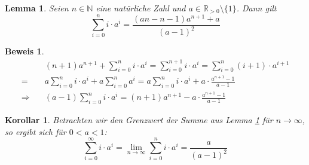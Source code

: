 \documentclass[a4paper]{article}
\newtheorem{korollar}[satz]{Korollar}
\newtheorem{lemma}[satz]{Lemma}
\theoremstyle{nonumberplain}
\newtheorem{beweis}{Beweis}
\begin{document}
\begin{lemma} \label{lem-infsum}
	Seien $n \in \mathbb{N}$ eine natürliche Zahl und $a \in \mathbb{R}_{>0}\setminus\{1\}$. Dann gilt
	\begin{equation}
		\sum_{i=0}^{n}{i\cdot a^i} = \frac{(an-n-1)a^{n+1}+a}{(a-1)^2}
	\end{equation}
\end{lemma}
\begin{beweis}
	\begin{align*}
		&(n+1) a^{n+1} + \sum_{i=0}^{n}{i\cdot a^i} = \sum_{i=0}^{n+1}{i\cdot a^i} = \sum_{i=0}^{n}{(i+1)\cdot a^{i+1}} \\
		=& a \sum_{i=0}^{n}{i\cdot a^{i}} + a \sum_{i=0}^{n}{a^{i}} = a \sum_{i=0}^{n}{i\cdot a^{i}} + a \cdot \frac{a^{n+1}-1}{a-1}\\
		\Rightarrow \quad & (a-1) \sum_{i=0}^{n}{i\cdot a^i} = (n+1) a^{n+1} - a \cdot \frac{a^{n+1}-1}{a-1} 
	\end{align*}
\end{beweis}
\begin{korollar} \label{kor-infsum}
Betrachten wir den Grenzwert der Summe aus Lemma \ref{lem-infsum} für $n \to \infty$, so ergibt sich für $0<a<1$:
\begin{equation}
\sum_{i=0}^{\infty}{i\cdot a^i}
= \lim\limits_{n \to \infty} \sum_{i=0}^{n}{i\cdot a^i}
= \frac{a}{(a-1)^2}
\end{equation}
\end{korollar}
\end{document}
